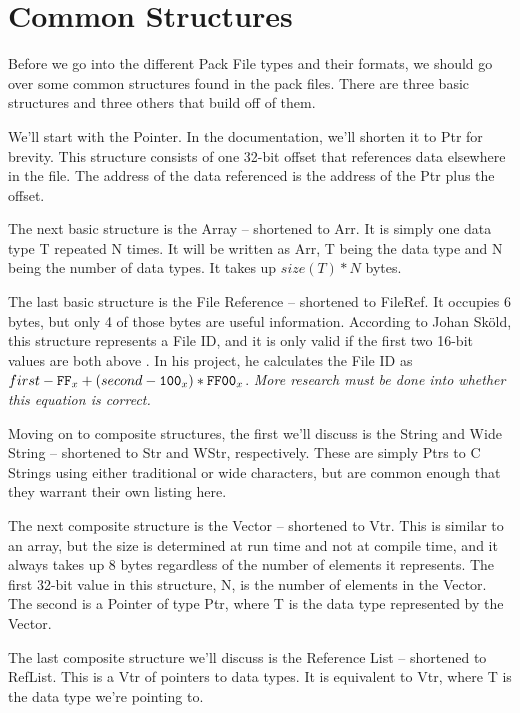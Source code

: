\section{Common Structures}
\label{sec:pfcommonstructures}
Before we go into the different Pack File types and their formats, we should go
over some common structures found in the pack files.  There are three basic
structures and three others that build off of them.

We'll start with the Pointer.  In the documentation, we'll shorten it to Ptr for
brevity.  This structure consists of one 32-bit offset that references data
elsewhere in the file.  The address of the data referenced is the address of the
Ptr plus the offset.

The next basic structure is the Array -- shortened to Arr.  It is simply one
data type T repeated N times.  It will be written as Arr, T being the
data type and N being the number of data types.  It takes up $size(T)*N$ bytes.

The last basic structure is the File Reference -- shortened to FileRef.  It
occupies 6 bytes, but only 4 of those bytes are useful information.  According
to Johan Sköld, this structure represents a File ID, and it is only valid if the
first two 16-bit values are both above .  In his project, he calculates
the File ID as $first - \texttt{FF$_x$} + (second - \texttt{100$_x$}) * \texttt{FF00$_x$}$.
\emph{More research must be done into whether this equation is correct.}

Moving on to composite structures, the first we'll discuss is the String and
Wide String -- shortened to Str and WStr, respectively.  These are simply Ptrs
to C Strings using either traditional or wide characters, but are common enough
that they warrant their own listing here.

The next composite structure is the Vector -- shortened to Vtr.  This is similar
to an array, but the size is determined at run time and not at compile time, and
it always takes up 8 bytes regardless of the number of elements it represents.
The first 32-bit value in this structure, N, is the number of elements in the
Vector. The second is a Pointer of type Ptr, where T is the
data type represented by the Vector.

The last composite structure we'll discuss is the Reference List -- shortened
to RefList.  This is a Vtr of pointers to data types.  It is equivalent to
Vtr, where T is the data type we're pointing to.























